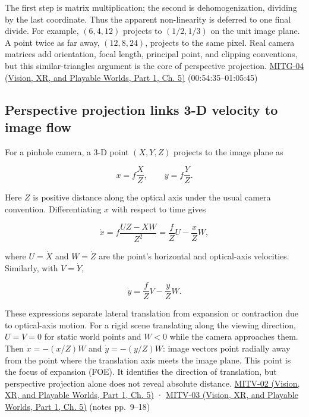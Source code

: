 The first step is matrix multiplication; the second is dehomogenization, dividing by the last coordinate. Thus the apparent non-linearity is deferred to one final divide. For example, \((6,4,12)\) projects to \((1/2,1/3)\) on the unit image plane. A point twice as far away, \((12,8,24)\), projects to the same pixel. Real camera matrices add orientation, focal length, principal point, and clipping conventions, but this similar-triangles argument is the core of perspective projection. \href{../07-Vision-XR-and-Playable-Worlds-P01/main.pdf\#nameddest=04-visual-computing-ii-ch036-mitg-04---transformations}{MITG-04 (Vision, XR, and Playable Worlds, Part 1, Ch. 5)} (00:54:35--01:05:45)

\subsection{Perspective projection links 3-D velocity to image flow}\label{03-visual-computing-i-ch003-perspective-projection-links-3-d-velocity-to-image-flow}

\hypertarget{03-visual-computing-i-ch003-perspective-projection-links-3-d-velocity-to-image-flow}{}

For a pinhole camera, a 3-D point \((X,Y,Z)\) projects to the image plane as

\[
x=f\frac{X}{Z},\qquad y=f\frac{Y}{Z}.
\]

Here \(Z\) is positive distance along the optical axis under the usual camera convention. Differentiating \(x\) with respect to time gives

\[
\dot{x}=f\frac{U Z-XW}{Z^2}=\frac{f}{Z}U-\frac{x}{Z}W,
\]

where \(U=\dot X\) and \(W=\dot Z\) are the point's horizontal and optical-axis velocities. Similarly, with \(V=\dot Y\),

\[
\dot{y}=\frac{f}{Z}V-\frac{y}{Z}W.
\]

These expressions separate lateral translation from expansion or contraction due to optical-axis motion. For a rigid scene translating along the viewing direction, \(U=V=0\) for static world points and \(W<0\) while the camera approaches them. Then \(\dot{x}=-(x/Z)W\) and \(\dot{y}=-(y/Z)W\): image vectors point radially away from the point where the translation axis meets the image plane. This point is the focus of expansion (FOE). It identifies the direction of translation, but perspective projection alone does not reveal absolute distance. \href{../07-Vision-XR-and-Playable-Worlds-P01/main.pdf\#nameddest=04-visual-computing-ii-ch036-mitv-02---image-formation-perspective-projection-time-derivative-motion-field}{MITV-02 (Vision, XR, and Playable Worlds, Part 1, Ch. 5)} · \href{../07-Vision-XR-and-Playable-Worlds-P01/main.pdf\#nameddest=04-visual-computing-ii-ch036-mitv-03---time-to-contact-focus-of-expansion-direct-motion-vision-methods-noise-gain}{MITV-03 (Vision, XR, and Playable Worlds, Part 1, Ch. 5)} (notes pp.~9--18)

